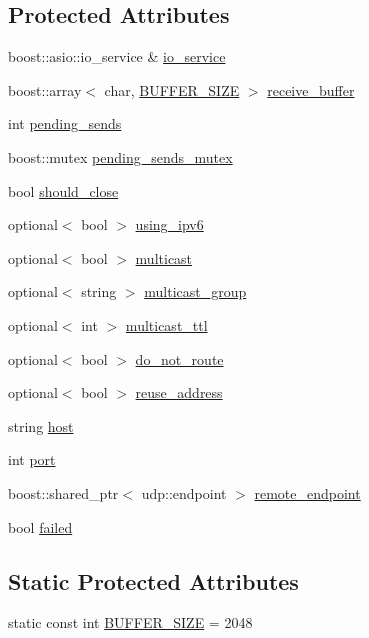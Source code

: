 \subsection*{Protected Attributes}
\begin{DoxyCompactItemize}
\item 
boost::asio::io\_\-service \& \hyperlink{classUdp_a7e143116ab3a0f478c8461ca04af782b}{io\_\-service}
\item 
boost::array$<$ char, \hyperlink{classUdp_aa72dc03ed420eee2098841f5998e3c53}{BUFFER\_\-SIZE} $>$ \hyperlink{classUdp_a7f21cfeaaccb297124d7582607981afc}{receive\_\-buffer}
\item 
int \hyperlink{classUdp_ac4b9b234de6090250125a1ea05764014}{pending\_\-sends}
\item 
boost::mutex \hyperlink{classUdp_af67ced15878e36d5dbfa433262876922}{pending\_\-sends\_\-mutex}
\item 
bool \hyperlink{classUdp_a01a27e2a1b252f39cefd61eb81a18220}{should\_\-close}
\item 
optional$<$ bool $>$ \hyperlink{classUdp_a3522427333a9a3520e8c8a207cb1a6f2}{using\_\-ipv6}
\item 
optional$<$ bool $>$ \hyperlink{classUdp_aff2511b739bdeee2875c07305b364042}{multicast}
\item 
optional$<$ string $>$ \hyperlink{classUdp_a012f2fbbab10ad7112b6c727e6951207}{multicast\_\-group}
\item 
optional$<$ int $>$ \hyperlink{classUdp_a11f39b2d209d628bdb52ff461e5898d2}{multicast\_\-ttl}
\item 
optional$<$ bool $>$ \hyperlink{classUdp_ace1cbe1cd248a6ae689848f25c26d9d1}{do\_\-not\_\-route}
\item 
optional$<$ bool $>$ \hyperlink{classUdp_a7572159d5d08e4e85e8a1eeba37eb1b9}{reuse\_\-address}
\item 
string \hyperlink{classUdp_a798fd48815d9d97045e8e6a3a290d301}{host}
\item 
int \hyperlink{classUdp_af69ea781b31a1fa62e5d3012b6288dc8}{port}
\item 
boost::shared\_\-ptr$<$ udp::endpoint $>$ \hyperlink{classUdp_ae7fa8c26a933bf54f13f2230760a17e3}{remote\_\-endpoint}
\item 
bool \hyperlink{classUdp_a91a6ea6959febc662830e818b89ed884}{failed}
\end{DoxyCompactItemize}
\subsection*{Static Protected Attributes}
\begin{DoxyCompactItemize}
\item 
static const int \hyperlink{classUdp_aa72dc03ed420eee2098841f5998e3c53}{BUFFER\_\-SIZE} = 2048
\end{DoxyCompactItemize}

